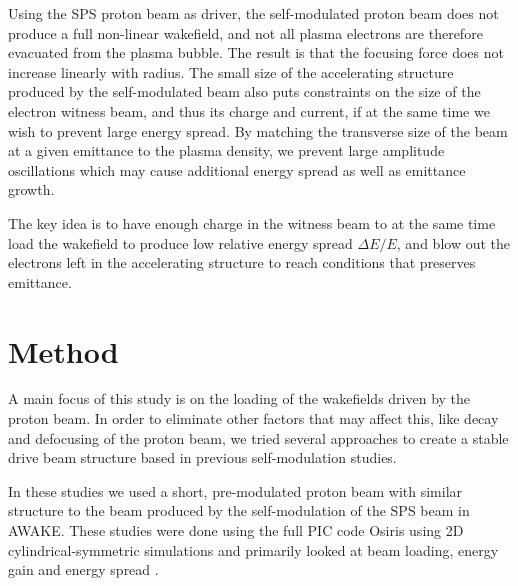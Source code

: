 \documentclass[aps,prstab,reprint,amsmath,amssymb,groupedaddress]{revtex4-1}
\begin{document}
Using the SPS proton beam as driver, the self-modulated proton beam does not produce a full non-linear wakefield, and
not all plasma electrons are therefore evacuated from the plasma bubble. The result is that the focusing force does not
increase linearly with radius. The small size of the accelerating structure produced by the self-modulated beam also
puts constraints on the size of the electron witness beam, and thus its charge and current, if at the same time we wish
to prevent large energy spread. By matching the transverse size of the beam at a given emittance to the plasma density,
we prevent large amplitude oscillations which may cause additional energy spread as well as emittance growth.


The key idea is to have enough charge in the witness beam to at the same time load the wakefield to produce low
relative energy spread $\Delta E/E$, and blow out the electrons left in the accelerating structure to reach conditions
that preserves emittance.

\section[\label{S:M}]{Method}

A main focus of this study is on the loading of the wakefields driven by the proton beam. In order to eliminate other
factors that may affect this, like decay and defocusing of the proton beam, we tried several approaches to create a
stable drive beam structure based in previous self-modulation studies.

In these studies we used a short, pre-modulated proton beam with similar structure to the beam produced by the
self-modulation of the SPS beam in AWAKE. These studies were done using the full PIC code Osiris \cite{fonseca:2002}
using 2D cylindrical-symmetric simulations and primarily looked at beam loading, energy gain and energy spread
\cite{berglyd_olsen:2015, berglyd_olsen:2016}.
\end{document}
